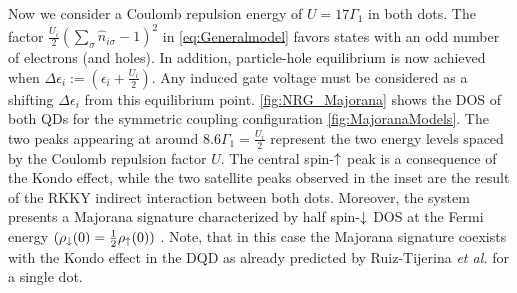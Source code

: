 Now we consider a Coulomb repulsion energy of $U = 17\Gamma_1$ in both dots. The factor $ \frac{U_i}{2}(\sum_{\sigma} \hat{n}_{i\sigma}-1)^{2}$ in \eqref{eq:Generalmodel} favors states with an odd number of electrons (and holes). In addition, particle-hole equilibrium is now achieved when $\Delta \epsilon_{i} := \left(\epsilon_{i}+\frac{U_i}{2}\right)$.  Any induced gate voltage must be considered as a shifting $\Delta \epsilon_{i}$ from this equilibrium point. \ref{fig:NRG_Majorana} shows the DOS of both QDs for the symmetric coupling configuration \ref{fig:MajoranaModels}. The two peaks appearing at around $8.6\Gamma_1 = \frac{U_i}{2}$ represent the two energy levels spaced by the Coulomb repulsion factor $U$. The central spin-$\uparrow$ peak is a consequence of the Kondo effect, \cite{hewson_kondo_1997,wilson_renormalization_1975}  while the two satellite peaks observed in the inset  are the result of the  RKKY indirect interaction between both dots.  \cite{ruderman_indirect_1954,kasuya_theory_1956,yosida_magnetic_1957} Moreover, the system presents a Majorana signature characterized by half spin-$\downarrow$ DOS at the Fermi energy $(\rho_\downarrow(0) = \frac{1}{2}\rho_\uparrow(0))$  . Note, that in this case the Majorana signature coexists with the Kondo effect in the DQD as already predicted by Ruiz-Tijerina \textit{et al.} for a single dot. \cite{ruiz-tijerina_interaction_2015}



